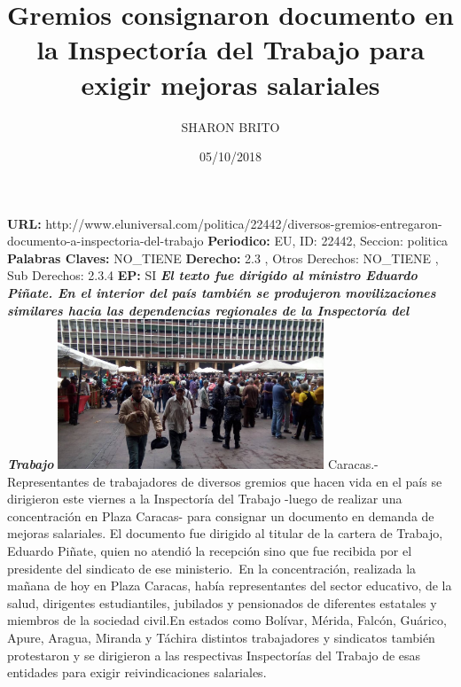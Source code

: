 \documentclass{article}%
\title{\textbf{Gremios consignaron documento en la Inspectoría del Trabajo para exigir mejoras salariales}}%
\author{SHARON BRITO}%
\date{05/10/2018}%
\begin{document}
%
\normalsize%
\maketitle%
\textbf{URL: }%
http://www.eluniversal.com/politica/22442/diversos{-}gremios{-}entregaron{-}documento{-}a{-}inspectoria{-}del{-}trabajo\newline%
%
\textbf{Periodico: }%
EU, %
ID: %
22442, %
Seccion: %
politica\newline%
%
\textbf{Palabras Claves: }%
NO\_TIENE\newline%
%
\textbf{Derecho: }%
2.3%
, Otros Derechos: %
NO\_TIENE%
, Sub Derechos: %
2.3.4%
\newline%
%
\textbf{EP: }%
SI\newline%
\newline%
%
\textbf{\textit{El texto fue dirigido al ministro Eduardo Piñate. En el interior del país también se produjeron movilizaciones similares hacia las dependencias regionales de la Inspectoría del Trabajo}}%
\newline%
\newline%
%
\includegraphics[width=300px]{56.jpg}%
\newline%
%
Caracas.{-} Representantes de trabajadores de diversos gremios que hacen vida en el país se dirigieron este viernes a la Inspectoría del Trabajo {-}luego de realizar una concentración en Plaza Caracas{-} para consignar un documento en demanda de mejoras salariales.%
\newline%
%
El documento fue dirigido al titular de la cartera de Trabajo, Eduardo Piñate, quien no atendió la recepción sino que fue recibida por el presidente del sindicato de ese ministerio.~En la concentración, realizada la mañana de hoy en Plaza Caracas, había representantes del sector educativo, de la salud, dirigentes estudiantiles, jubilados y pensionados de diferentes estatales y miembros de la sociedad civil.En estados como Bolívar, Mérida, Falcón, Guárico, Apure, Aragua, Miranda y Táchira distintos trabajadores y sindicatos también protestaron y se dirigieron a las respectivas Inspectorías del Trabajo de esas entidades para exigir reivindicaciones salariales.%
\end{document}
